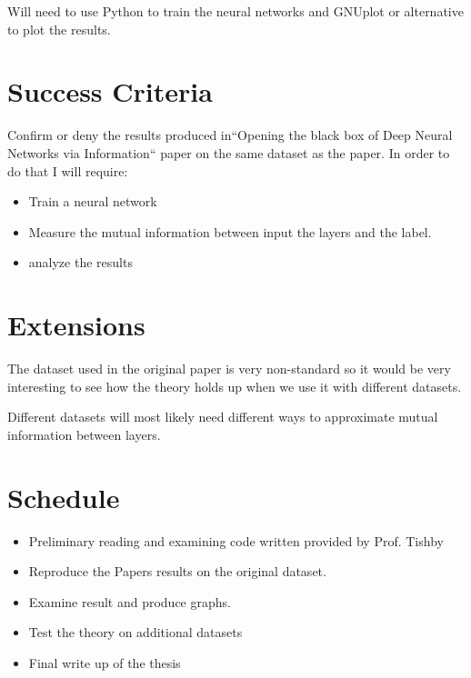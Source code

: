 \documentclass[12pt]{article}
\begin{document}
Will need to use Python to train the neural networks and GNUplot or alternative
to plot the results.

\section*{Success Criteria}

Confirm or deny the results produced in``Opening the black box of Deep Neural
Networks via Information`` paper on the same dataset as the paper. In order to do
that I will require:

\begin{itemize}
  \item Train a neural network
  \item Measure the mutual information between input the layers and the label.
  \item analyze the results
\end{itemize}

\section*{Extensions}

The dataset used in the original paper is very non-standard so it would be very
interesting to see how the theory holds up when we use it with different
datasets.

Different datasets will most likely need different ways to approximate mutual
information between layers.

\section*{Schedule}




\begin{itemize}
  \item {

      Preliminary reading and examining code written provided by Prof. Tishby
  } \item {

      Reproduce the Papers results on the original dataset.
  } \item {

      Examine result and produce graphs.
  } \item {

      Test the theory on additional datasets 
  } \item {

      Final write up of the thesis
  }
\end{itemize}
\end{document}
